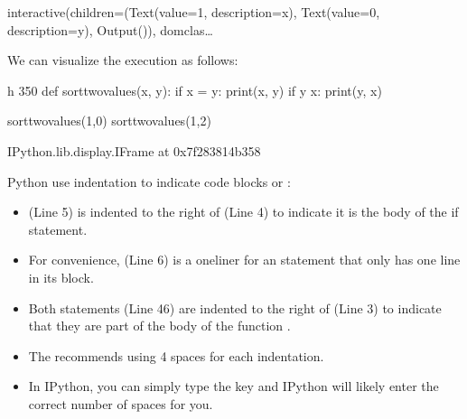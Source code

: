 \documentclass[letterpaper,10pt,english]{sphinxmanual}
\begin{document}
\begin{sphinxVerbatim}[commandchars=\\\{\}]
interactive(children=(Text(value=\PYGZsq{}1\PYGZsq{}, description=\PYGZsq{}x\PYGZsq{}), Text(value=\PYGZsq{}0\PYGZsq{}, description=\PYGZsq{}y\PYGZsq{}), Output()), \PYGZus{}dom\PYGZus{}clas…
\end{sphinxVerbatim}

We can visualize the execution as follows:

\begin{sphinxVerbatim}[commandchars=\\\{\}]
 \PYGZhy{}h 350
def sort\PYGZus{}two\PYGZus{}values(x, y):
    if x \PYGZlt{}= y:
        print(x, y)
    if y \PYGZlt{} x: print(y, x)
        
sort\PYGZus{}two\PYGZus{}values(1,0)
sort\PYGZus{}two\PYGZus{}values(1,2)
\end{sphinxVerbatim}

\begin{sphinxVerbatim}[commandchars=\\\{\}]
\PYGZlt{}IPython.lib.display.IFrame at 0x7f283814b358\PYGZgt{}
\end{sphinxVerbatim}

Python use indentation to indicate code blocks or :
\begin{itemize}
\item {} 
 (Line 5) is indented to the right of  (Line 4) to indicate it is the body of the if statement.

\item {} 
For convenience,  (Line 6) is a one\sphinxhyphen{}liner for an  statement that only has one line in its block.

\item {} 
Both  statements (Line 4\sphinxhyphen{}6) are indented to the right of  (Line 3) to indicate that they are part of the body of the function .

\end{itemize}

\begin{itemize}
\item {} 
The  recommends using 4 spaces for each indentation.

\item {} 
In IPython, you can simply type the  key and IPython will likely enter the correct number of spaces for you.

\end{itemize}
\end{document}
